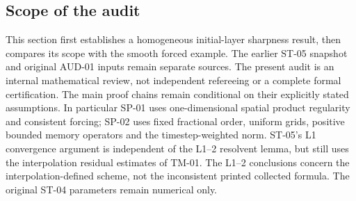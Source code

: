 \documentclass[11pt,a4paper]{amsart}
\theoremstyle{remark}
\theoremstyle{plain}
\theoremstyle{remark}
\numberwithin{equation}{section}
\begin{document}
\subsection{Scope of the audit}
This section first establishes a homogeneous initial-layer sharpness result, then compares its scope with the smooth forced example. The earlier ST-05 snapshot and original AUD-01 inputs remain separate sources. The present audit is an internal mathematical review, not independent refereeing or a complete formal certification. The main proof chains remain conditional on their explicitly stated assumptions. In particular SP-01 uses one-dimensional spatial product regularity and consistent forcing; SP-02 uses fixed fractional order, uniform grids, positive bounded memory operators and the timestep-weighted norm. ST-05's L1 convergence argument is independent of the L1--2 resolvent lemma, but still uses the interpolation residual estimates of TM-01. The L1--2 conclusions concern the interpolation-defined scheme, not the inconsistent printed collected formula. The original ST-04 parameters remain numerical only.
\end{document}
